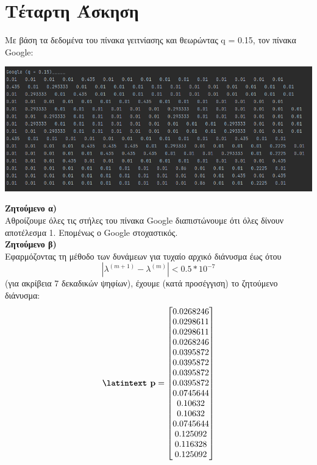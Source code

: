 \documentclass{article}
\newcommand{\lt}{\latintext}
\newcommand{\gt}{\greektext}
\begin{document}
\newpage
\section{\gt Τέταρτη Άσκηση}
\gt Με βάση τα δεδομένα του πίνακα γειτνίασης και θεωρώντας \lt q = 0.15,  τον
\gt πίνακα \lt Google:
\begin{center}
        \includegraphics[scale=0.65]{images/google q = 0.15.png}        
\end{center}

\textbf{\gt Ζητούμενο α)}\\
\gt Αθροίζουμε όλες τις στήλες του πίνακα \lt Google  διαπιστώνουμε ότι όλες δίνουν
\gt αποτέλεσμα 1. Επομένως ο \lt Google  στοχαστικός.\\

\textbf{\gt Ζητούμενο β)}\\
\gt Εφαρμόζοντας τη μέθοδο των δυνάμεων για τυχαίο αρχικό διάνυσμα έως ότου
\begin{equation*}
    \left| \lambda ^{(m+1)} - \lambda ^{(m)}\right| < 0.5*10^{-7}
\end{equation*}
\gt (για ακρίβεια 7 δεκαδικών ψηφίων), \newpage
\gt έχουμε (κατά προσέγγιση) το ζητούμενο διάνυσμα:
\begin{equation*}
        \textbf{\lt p} = 
        \begin{bmatrix}
            0.0268246\\   
            0.0298611\\   
            0.0298611\\   
            0.0268246\\   
            0.0395872\\   
            0.0395872\\   
            0.0395872\\   
            0.0395872\\   
            0.0745644\\   
            0.10632\\   
            0.10632\\   
            0.0745644\\   
            0.125092\\   
            0.116328\\   
            0.125092\\ 
        \end{bmatrix}
    \end{equation*}\\
    
\end{document}
